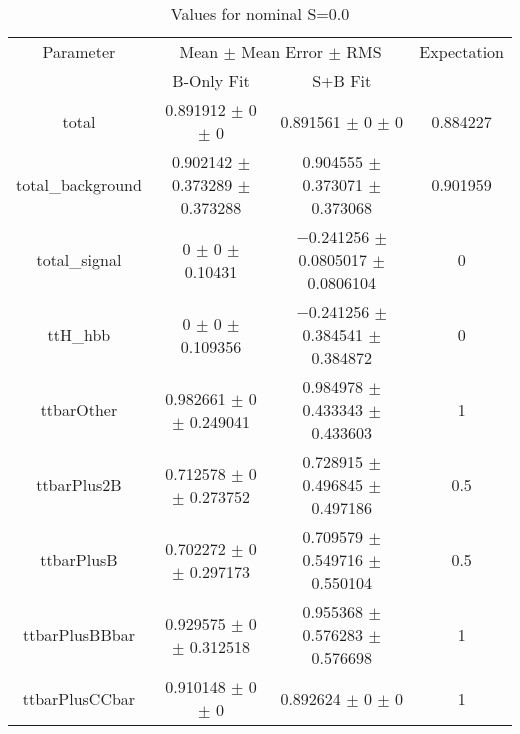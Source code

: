 \begin{table}
\centering
\caption{Values for nominal S=0.0}
\begin{tabular}{cccc}
\toprule
Parameter & \multicolumn{2}{c}{Mean $\pm$ Mean Error $\pm$ RMS} & Expectation\\
 & B-Only Fit & S+B Fit & \\
\midrule
total & \num{0.891912} $\pm$ \num{0} $\pm$ \num{0} & \num{0.891561} $\pm$ \num{0} $\pm$ \num{0} & \num{0.884227}\\
total\_background & \num{0.902142} $\pm$ \num{0.373289} $\pm$ \num{0.373288} & \num{0.904555} $\pm$ \num{0.373071} $\pm$ \num{0.373068} & \num{0.901959}\\
total\_signal & \num{0} $\pm$ \num{0} $\pm$ \num{0.10431} & \num{-0.241256} $\pm$ \num{0.0805017} $\pm$ \num{0.0806104} & \num{0}\\
ttH\_hbb & \num{0} $\pm$ \num{0} $\pm$ \num{0.109356} & \num{-0.241256} $\pm$ \num{0.384541} $\pm$ \num{0.384872} & \num{0}\\
ttbarOther & \num{0.982661} $\pm$ \num{0} $\pm$ \num{0.249041} & \num{0.984978} $\pm$ \num{0.433343} $\pm$ \num{0.433603} & \num{1}\\
ttbarPlus2B & \num{0.712578} $\pm$ \num{0} $\pm$ \num{0.273752} & \num{0.728915} $\pm$ \num{0.496845} $\pm$ \num{0.497186} & \num{0.5}\\
ttbarPlusB & \num{0.702272} $\pm$ \num{0} $\pm$ \num{0.297173} & \num{0.709579} $\pm$ \num{0.549716} $\pm$ \num{0.550104} & \num{0.5}\\
ttbarPlusBBbar & \num{0.929575} $\pm$ \num{0} $\pm$ \num{0.312518} & \num{0.955368} $\pm$ \num{0.576283} $\pm$ \num{0.576698} & \num{1}\\
ttbarPlusCCbar & \num{0.910148} $\pm$ \num{0} $\pm$ \num{0} & \num{0.892624} $\pm$ \num{0} $\pm$ \num{0} & \num{1}\\
\bottomrule
\end{tabular}
\end{table}